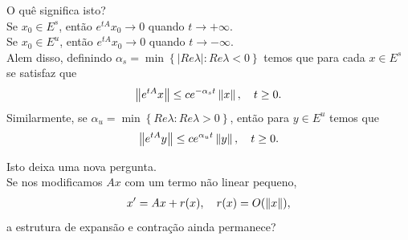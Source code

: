 \begin{frame}{}
  O quê significa isto?\\
  Se $x_0\in E^s$, então $e^{tA}x_0\to 0$ quando $t\to +\infty$.\\
  Se $x_0\in E^u$, então $e^{tA}x_0\to 0$ quando $t\to -\infty$.\\
  Alem disso, definindo $\alpha_s=\min\left\{ |Re\lambda|:Re\lambda<0 \right\}$ temos que para cada $x\in E^s$ se satisfaz que
  \begin{align*}
    \left\|e^{tA}x\right\|\leq ce^{-\alpha_st}\left\|x\right\|,\quad t\geq 0.
  \end{align*}
  Similarmente, se $\alpha_u=\min\left\{ Re\lambda:Re\lambda>0 \right\}$, então para $y\in E^{u}$ temos que
  \begin{align*}
    \left\|e^{tA}y\right\|\leq ce^{\alpha_ut}\left\|y\right\|,\quad t\geq 0.
  \end{align*}
\end{frame}

\begin{frame}{}
  \begin{block}{}
    Isto deixa uma nova pergunta.\\
    Se nos modificamos $Ax$ com um termo não linear pequeno,
    \begin{align*}
      x^{\prime}=Ax+r(x),\quad r(x)=O(\left\|x\right\|),
    \end{align*}
    a estrutura de expansão e contração ainda permanece?\\
  \end{block}
\end{frame}
